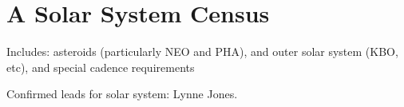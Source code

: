 \chapter[Solar System]{A Solar System Census}

Includes: asteroids (particularly NEO and PHA), and outer solar system
(KBO, etc), and special cadence requirements

Confirmed leads for solar system: Lynne Jones.

